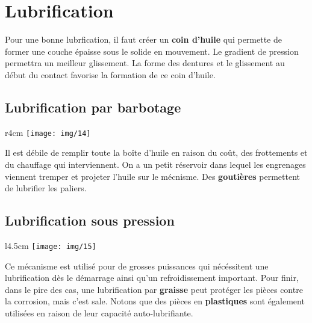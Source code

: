\section{Lubrification}
\noindent Pour une bonne lubrfication, il faut créer un \textbf{coin d'huile} qui permette de former une couche épaisse sous le solide en mouvement. Le gradient de pression permettra un meilleur glissement. La forme des dentures et le glissement au début du contact favorise la formation de ce coin d'huile. 

\subsection{Lubrification par barbotage}
	\begin{wrapfigure}[5]{r}{4cm}
	\vspace{-5mm}
	\texttt{[image: img/14]}
	\end{wrapfigure}	
	\noindent Il est débile de remplir toute la boîte d'huile en raison du coût, des frottements et du chauffage qui interviennent. On a un petit réservoir dans lequel les engrenages viennent tremper et projeter l'huile sur le mécnisme. Des \textbf{goutières} permettent de lubrifier les paliers. 
	
\subsection{Lubrification sous pression}
	\begin{wrapfigure}[6]{l}{4.5cm}
	\vspace{-5mm}
	\texttt{[image: img/15]}
	\end{wrapfigure}	
	\noindent Ce mécanisme est utilisé pour de grosses puissances qui nécéssitent une lubrification dès le démarrage ainsi qu'un refroidissement important. Pour finir, dans le pire des cas, une lubrification par \textbf{graisse} peut protéger les pièces contre la corrosion, mais c'est sale. Notons que des pièces en \textbf{plastiques} sont également utilisées en raison de leur capacité auto-lubrifiante.